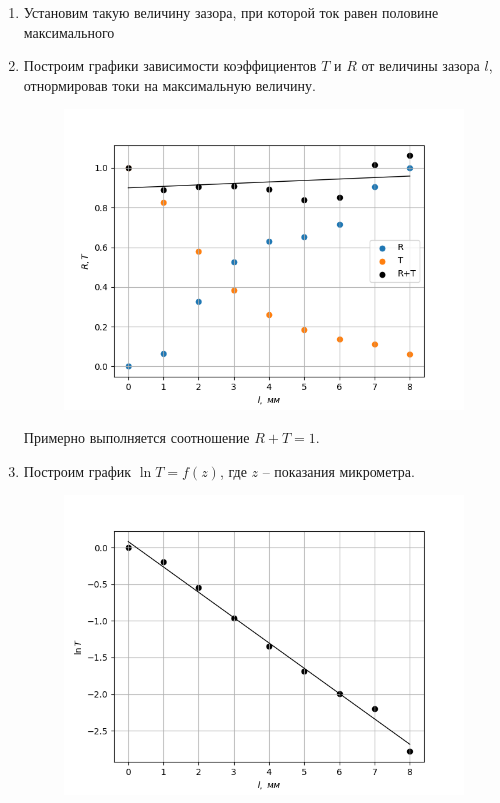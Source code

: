 \documentclass[14pt, a4paper]{report}
\begin{document}
\begin{enumerate}
\item Установим такую величину зазора, при которой ток равен половине максимального

\item Построим графики зависимости коэффициентов $T$ и $R$ от величины зазора $l$, отнормировав токи на максимальную величину.

\begin{figure}[H]
\centering
\includegraphics[scale=0.5]{../images/462_3.png}
\end{figure}

Примерно выполняется соотношение $R+T=1$.

\item Построим график $\ln{T}=f(z)$, где $z$ -- показания микрометра.

\begin{figure}[H]
\centering
\includegraphics[scale=0.5]{../images/462_4.png}
\end{figure}


\end{enumerate}
\end{document}
